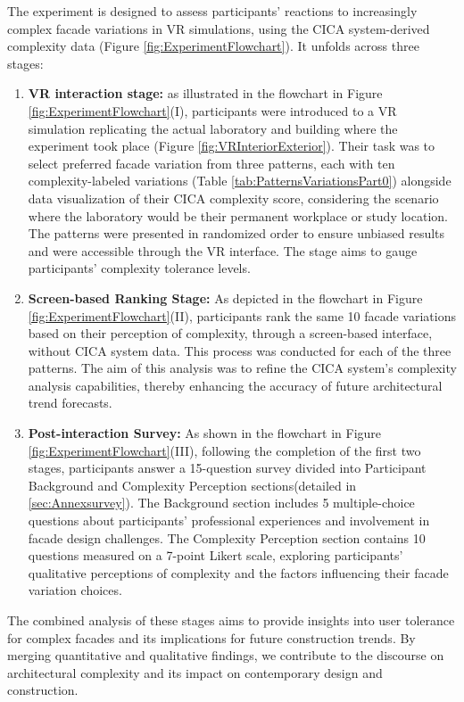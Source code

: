 %    


The experiment is designed to assess participants' reactions to increasingly complex facade variations in VR simulations, using the CICA system-derived complexity data (Figure \ref{fig:ExperimentFlowchart}). It unfolds across three stages:

\begin{enumerate}
    \item \textbf{VR interaction stage:}  as illustrated in the flowchart in Figure \ref{fig:ExperimentFlowchart}(I), participants were introduced to a VR simulation replicating the actual laboratory and building where the experiment took place (Figure \ref{fig:VRInteriorExterior}).
    Their task was to select preferred facade variation from three patterns, each with ten complexity-labeled variations (Table \ref{tab:PatternsVariationsPart0}) alongside data visualization of their CICA complexity score, considering the scenario where the laboratory would be their permanent workplace or study location.
    The patterns were presented in randomized order to ensure unbiased results and were accessible through the VR interface.
    The stage aims to gauge participants' complexity tolerance levels.
    \item \textbf{Screen-based Ranking Stage:} As depicted in the flowchart in Figure \ref{fig:ExperimentFlowchart}(II), participants rank the same 10 facade variations based on their perception of complexity, through a screen-based interface, without CICA system data.
    This process was conducted for each of the three patterns.
    The aim of this analysis was to refine the CICA system's complexity analysis capabilities, thereby enhancing the accuracy of future architectural trend forecasts.
    \item \textbf{Post-interaction Survey:} As shown in the flowchart in Figure \ref{fig:ExperimentFlowchart}(III), following the completion of the first two stages, participants answer a 15-question survey divided into Participant Background and Complexity Perception sections(detailed in \ref{sec:Annexsurvey}).
    The Background section includes 5 multiple-choice questions about participants' professional experiences and involvement in facade design challenges.
    The Complexity Perception section contains 10 questions measured on a 7-point Likert scale, exploring participants' qualitative perceptions of complexity and the factors influencing their facade variation choices.
\end{enumerate}


The combined analysis of these stages aims to provide insights into user tolerance for complex facades and its implications for future construction trends.
By merging quantitative and qualitative findings, we contribute to the discourse on architectural complexity and its impact on contemporary design and construction.